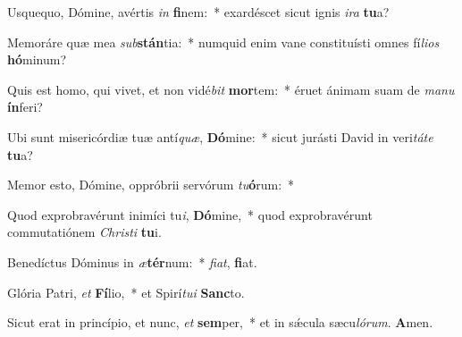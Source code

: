 \item Usquequo, Dómine, avértis \textit{in} \textbf{fi}nem:~* exardéscet sicut ignis \textit{i}\textit{ra} \textbf{tu}a?

\item Memoráre quæ mea \textit{sub}\textbf{stán}tia:~* numquid enim vane constituísti omnes fí\textit{li}\textit{os} \textbf{hó}minum?

\item Quis est homo, qui vivet, et non vidé\textit{bit} \textbf{mor}tem:~* éruet ánimam suam de \textit{ma}\textit{nu} \textbf{ín}feri?

\item Ubi sunt misericórdiæ tuæ antí\textit{quæ}, \textbf{Dó}mine:~* sicut jurásti David in veri\textit{tá}\textit{te} \textbf{tu}a?

\item Memor esto, Dómine, oppróbrii servórum \textit{tu}\textbf{ó}rum:~*

\item Quod exprobravérunt inimíci tu\textit{i}, \textbf{Dó}mine,~* quod exprobravérunt commutatiónem \textit{Chris}\textit{ti} \textbf{tu}i.

\item Benedíctus Dóminus in \textit{æ}\textbf{tér}num:~* \textit{fi}\textit{at}, \textbf{fi}at.

\item Glória Patri, \textit{et} \textbf{Fí}lio,~* et Spirí\textit{tu}\textit{i} \textbf{Sanc}to.

\item Sicut erat in princípio, et nunc, \textit{et} \textbf{sem}per,~* et in sǽcula sæcu\textit{ló}\textit{rum}. \textbf{A}men.

